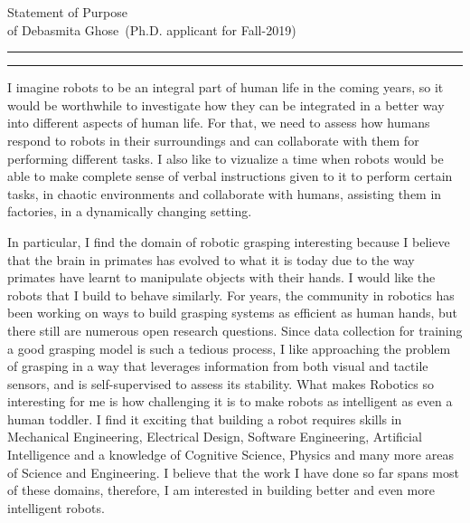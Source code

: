 \documentclass[11pt]{article}
\newcommand{\soptitle}{Statement of Purpose}
\newcommand{\yourname}{Debasmita Ghose}
\begin{document}
\begin{center}\LARGE\soptitle\\
\large of \yourname\ (Ph.D. applicant for Fall-2019)
\end{center}

\hrule
\vspace{0pt}
\hrule height 1pt


\justify
I imagine robots to be an integral part of human life in the coming years, so it would be worthwhile to investigate how they can be integrated in a better way into different aspects of human life. For that, we need to assess how humans respond to robots in their surroundings and can collaborate with them for performing different tasks. I also like to vizualize a time when robots would be able to make complete sense of verbal instructions given to it to perform certain tasks, in chaotic environments and collaborate with humans, assisting them in factories, in a dynamically changing setting.
\par
\justify
  In particular, I find the domain of robotic grasping interesting because I believe that the brain in primates has evolved to what it is today due to the way primates have learnt to manipulate objects with their hands. I would like the robots that I build to behave similarly. For years, the community in robotics has been working on ways to build grasping systems as efficient as  human hands, but there still are numerous open research questions. Since data collection for training a good grasping model is such a tedious process,  I like approaching the problem of grasping in a way that leverages information from both visual and tactile sensors, and is self-supervised to assess its stability. What makes Robotics so interesting for me is how challenging it is to make robots as intelligent as even a human toddler. I find it exciting that building a robot requires skills in Mechanical Engineering, Electrical Design, Software Engineering, Artificial Intelligence and a knowledge of Cognitive Science, Physics and many more areas of Science and Engineering. I believe that the work I have done so far spans most of these domains, therefore, I am interested in building better and even more intelligent robots.    
\par
\justify
\end{document}
